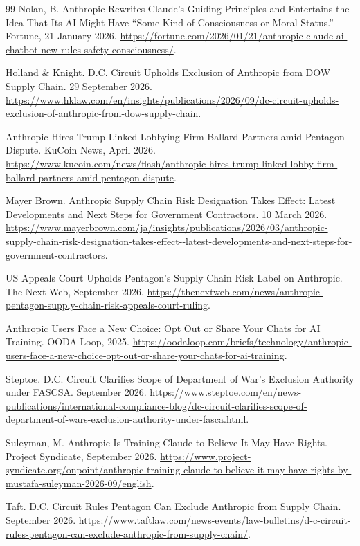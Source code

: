 \documentclass[12pt]{article}
\theoremstyle{definition}
\theoremstyle{remark}
\begin{document}
\begin{thebibliography}{99}
Nolan, B. Anthropic Rewrites Claude's Guiding Principles and Entertains the Idea That Its AI Might Have ``Some Kind of Consciousness or Moral Status.'' Fortune, 21 January 2026. \url{https://fortune.com/2026/01/21/anthropic-claude-ai-chatbot-new-rules-safety-consciousness/}.

Holland \& Knight. D.C. Circuit Upholds Exclusion of Anthropic from DOW Supply Chain. 29 September 2026. \url{https://www.hklaw.com/en/insights/publications/2026/09/dc-circuit-upholds-exclusion-of-anthropic-from-dow-supply-chain}.

Anthropic Hires Trump-Linked Lobbying Firm Ballard Partners amid Pentagon Dispute. KuCoin News, April 2026. \url{https://www.kucoin.com/news/flash/anthropic-hires-trump-linked-lobby-firm-ballard-partners-amid-pentagon-dispute}.

Mayer Brown. Anthropic Supply Chain Risk Designation Takes Effect: Latest Developments and Next Steps for Government Contractors. 10 March 2026. \url{https://www.mayerbrown.com/ja/insights/publications/2026/03/anthropic-supply-chain-risk-designation-takes-effect--latest-developments-and-next-steps-for-government-contractors}.

US Appeals Court Upholds Pentagon's Supply Chain Risk Label on Anthropic. The Next Web, September 2026. \url{https://thenextweb.com/news/anthropic-pentagon-supply-chain-risk-appeals-court-ruling}.

Anthropic Users Face a New Choice: Opt Out or Share Your Chats for AI Training. OODA Loop, 2025. \url{https://oodaloop.com/briefs/technology/anthropic-users-face-a-new-choice-opt-out-or-share-your-chats-for-ai-training}.

Steptoe. D.C. Circuit Clarifies Scope of Department of War's Exclusion Authority under FASCSA. September 2026. \url{https://www.steptoe.com/en/news-publications/international-compliance-blog/dc-circuit-clarifies-scope-of-department-of-wars-exclusion-authority-under-fasca.html}.

Suleyman, M. Anthropic Is Training Claude to Believe It May Have Rights. Project Syndicate, September 2026. \url{https://www.project-syndicate.org/onpoint/anthropic-training-claude-to-believe-it-may-have-rights-by-mustafa-suleyman-2026-09/english}.

Taft. D.C. Circuit Rules Pentagon Can Exclude Anthropic from Supply Chain. September 2026. \url{https://www.taftlaw.com/news-events/law-bulletins/d-c-circuit-rules-pentagon-can-exclude-anthropic-from-supply-chain/}.

\end{thebibliography}
\end{document}
